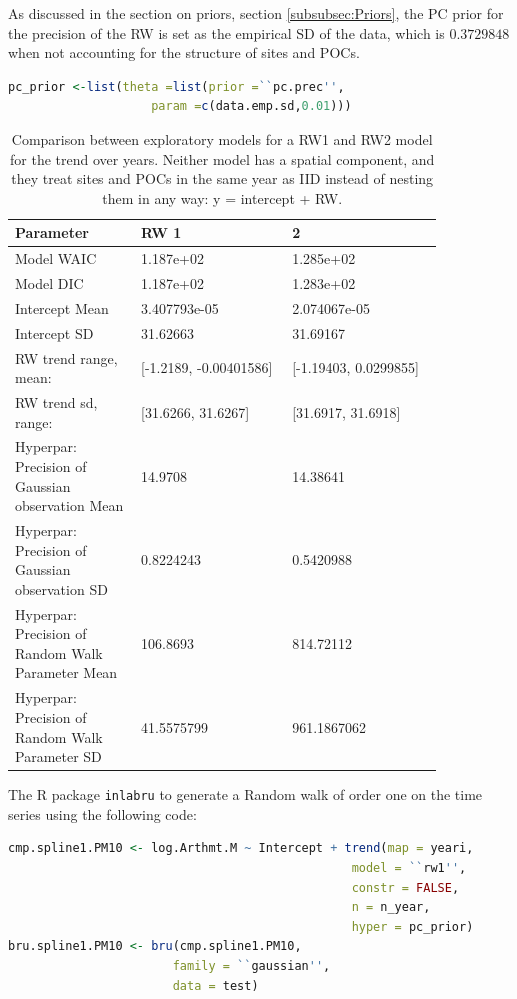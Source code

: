 \documentclass{article}
\begin{document}
As discussed in the section on priors, section \ref{subsubsec:Priors}, the \ac{PC} prior for the precision of the RW is set as the empirical SD of the data, which is $0.3729848$ when not accounting for the structure of sites and \ac{POC}s.
\begin{lstlisting}[language=R]
    pc_prior <-list(theta =list(prior =``pc.prec'',
                    param =c(data.emp.sd,0.01)))
\end{lstlisting}

\begin{table}[ht]
    \centering
    \begin{tabular}{p{0.25\linewidth}|p{0.30\linewidth}|p{0.30\linewidth}}
        Parameter & RW 1 &  2 \\ \hline
         Model WAIC & 1.187e+02 & 1.285e+02\\
         Model DIC & 1.187e+02 & 1.283e+02 \\
         \hline
         Intercept Mean & 3.407793e-05 & 2.074067e-05 \\
         Intercept SD & 31.62663 & 31.69167 \\
         \hline
         RW trend range, mean: & [-1.2189, -0.00401586] & [-1.19403, 0.0299855] \\
         RW trend sd, range: & [31.6266, 31.6267] & [31.6917, 31.6918] \\
         \hline
         Hyperpar: Precision of Gaussian observation Mean & 14.9708 & 14.38641 \\
         Hyperpar: Precision of Gaussian observation SD & 0.8224243 & 0.5420988 \\
         Hyperpar: Precision of Random Walk Parameter Mean & 106.8693 & 814.72112 \\
         Hyperpar: Precision of Random Walk Parameter SD & 41.5575799 & 961.1867062 \\
         
    \end{tabular}
    \caption{Comparison between exploratory models for a \ac{RW}1 and \ac{RW}2 model for the trend over years.  Neither model has a spatial component, and they treat sites and \ac{POC}s in the same year as \ac{IID} instead of nesting them in any way: y = intercept + RW. }
\label{tab:RW_parameters}
\end{table}

The R package \lstinline{inlabru} to generate a Random walk of order one on the time series using the following code:
\begin{lstlisting}[language = R]
cmp.spline1.PM10 <- log.Arthmt.M ~ Intercept + trend(map = yeari,
                                                model = ``rw1'',
                                                constr = FALSE,
                                                n = n_year,
                                                hyper = pc_prior)
bru.spline1.PM10 <- bru(cmp.spline1.PM10,
                       family = ``gaussian'',
                       data = test)
    
\end{lstlisting}
                       
\end{document}

